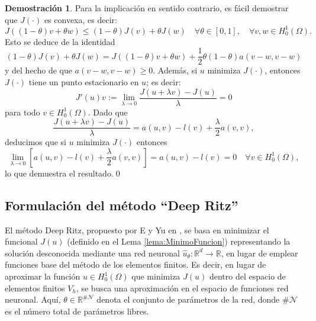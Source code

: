 \documentclass[a4paper,11pt,spanish, twoside, leqno]{tfg-uam}
\theoremstyle{definition}
\newtheorem{dem}[teor]{Demostración}
\begin{document}
\begin{dem}
    Para la implicación en sentido contrario, es fácil demostrar que $J(\cdot)$ es convexa, es decir:
    \begin{equation*}
    J((1 - \theta)v + \theta w) \leq (1 - \theta)J(v) + \theta J(w) \quad \forall \theta \in [0,1], \quad \forall v, w \in H_0^1(\Omega).
    \end{equation*}   
    Esto se deduce de la identidad
    \begin{equation*}
    (1 - \theta)J(v) + \theta J(w) = J((1 - \theta)v + \theta w) + \frac{1}{2} \theta (1 - \theta)a(v - w, v - w)
    \end{equation*}   
    y del hecho de que $a(v - w, v - w) \geq 0$. Además, si $u$ minimiza $J(\cdot)$, entonces $J(\cdot)$ tiene un punto estacionario en $u$; es decir:
    \begin{equation*}
    J'(u)v := \lim_{\lambda \to 0} \frac{J(u + \lambda v) - J(u)}{\lambda} = 0
    \end{equation*}   
    para todo $v \in H_0^1(\Omega)$. Dado que
    \begin{equation*}
    \frac{J(u + \lambda v) - J(u)}{\lambda} = a(u, v) - l(v) + \frac{\lambda}{2} a(v, v),
    \end{equation*}   
    deducimos que si $u$ minimiza $J(\cdot)$ entonces
    \begin{equation*}
    \lim_{\lambda \to 0} [a(u, v) - l(v) + \frac{\lambda}{2} a(v, v)] = a(u, v) - l(v) = 0 \quad \forall v \in H_0^1(\Omega),
    \end{equation*}   
    lo que demuestra el resultado.\qed
\end{dem}

\subsection{Formulación del método ``Deep Ritz''}

El método Deep Ritz, propuesto por E y Yu en \cite{e2017deepritzmethoddeep}, se basa en minimizar el funcional $ J(u) $ (definido en el Lema \ref{lema:MinimoFuncion}) representando la solución desconocida mediante una red neuronal $ \hat{u}_\theta: \mathbb{R}^d \to \mathbb{R} $, en lugar de emplear funciones base del método de los elementos finitos. Es decir, en lugar de aproximar la función $ u \in H_0^1(\Omega) $ que minimiza $ J(u) $ dentro del espacio de elementos finitos $ V_h $, se busca una aproximación en el espacio de funciones red neuronal. Aquí, $ \theta \in \mathbb{R}^{\# \mathcal{N}} $ denota el conjunto de parámetros de la red, donde $ \# \mathcal{N} $ es el número total de parámetros libres.
\end{document}
